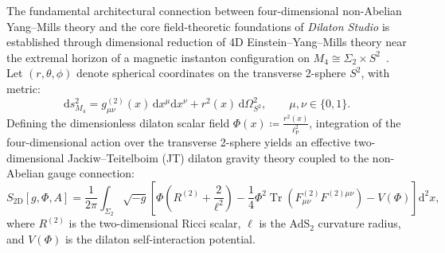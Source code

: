 \documentclass[11pt,a4paper,reqno]{article}
\theoremstyle{plain}
\theoremstyle{definition}
\theoremstyle{remark}
\numberwithin{equation}{section}
\providecommand{\diff}{\mathrm{d}}
\begin{document}
The fundamental architectural connection between four-dimensional non-Abelian Yang--Mills theory and the core field-theoretic foundations of \emph{Dilaton Studio} is established through dimensional reduction of 4D Einstein--Yang--Mills theory near the extremal horizon of a magnetic instanton configuration on $M_4 \cong \Sigma_2 \times S^2$~\cite{Jackiw1984, Teitelboim1983, AlmheiriPolchinski2015}. Let $(r, \theta, \phi)$ denote spherical coordinates on the transverse 2-sphere $S^2$, with metric:
\begin{equation}
  \diff s^2_{M_4} = g_{\mu\nu}^{(2)}(x) \, \diff x^\mu \diff x^\nu + r^2(x) \, \diff \Omega_{S^2}^2, \qquad \mu, \nu \in \{0, 1\}.
\end{equation}
Defining the dimensionless dilaton scalar field $\Phi(x) \coloneqq \frac{r^2(x)}{\ell_{\mathrm{P}}^2}$, integration of the four-dimensional action over the transverse 2-sphere yields an effective two-dimensional Jackiw--Teitelboim (JT) dilaton gravity theory coupled to the non-Abelian gauge connection:
\begin{equation}
  S_{2\mathrm{D}}[g, \Phi, A] = \frac{1}{2\pi} \int_{\Sigma_2} \sqrt{-g} \left[ \Phi \left( R^{(2)} + \frac{2}{\ell^2} \right) - \frac{1}{4} \Phi^2 \operatorname{Tr}\left( F_{\mu\nu}^{(2)} F^{(2)\mu\nu} \right) - V(\Phi) \right] \diff^2 x,
  \label{eq:2d_dilaton_ym_action}
\end{equation}
where $R^{(2)}$ is the two-dimensional Ricci scalar, $\ell$ is the AdS$_2$ curvature radius, and $V(\Phi)$ is the dilaton self-interaction potential.
\end{document}
